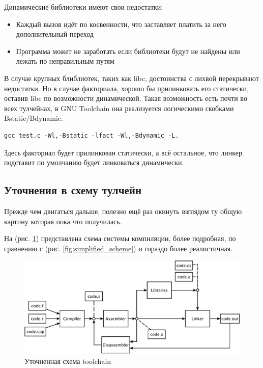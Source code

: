 \documentclass[a4paper,12pt,oneside]{article}
\begin{document}
Динамические библиотеки имеют свои недостатки:

\begin{itemize}
\item Каждый вызов идёт по косвенности, что заставляет платить за него дополнительный переход
\item Программа может не заработать если библиотеки будут не найдены или лежать по неправильным путям
\end{itemize}

В случае крупных блиблиотек, таких как libc, достоинства с лихвой перекрывают недостатки. Но в случае факториала, хорошо бы прилинковать его статически, оставив libc по возможности динамической. Такая возможность есть почти во всех тулчейнах, в GNU Toolchain она реализуется логическими скобками Bstatic/Bdynamic.

\begin{verbatim}
gcc test.c -Wl,-Bstatic -lfact -Wl,-Bdynamic -L.
\end{verbatim}

Здесь факториал будет прилинкован статически, а всё остальное, что линкер подставит по умолчанию будет линковаться динамически.

\subsection{Уточнения в схему тулчейн}\label{subsec:Amendments}

Прежде чем двигаться дальше, полезно ещё раз окинуть взглядом ту общую картину которая пока что получилась.

На (рис. \ref{fig:toolchain_completed}) представлена схема системы компиляции, более подробная, по сравнению с (рис. \ref{fig:simplified_scheme}) и гораздо более реалистичная.

\begin{figure}[ht]
\centering
\includegraphics[width=1.0\textwidth]{illustrations/mipt-scheme-crop.pdf}
\caption{Уточненная схема toolchain}
\label{fig:toolchain_completed}
\end{figure}
\end{document}
